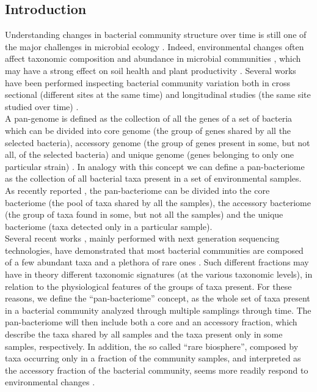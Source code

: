 \subsection{Introduction}
Understanding changes in bacterial community structure over time is still one of the major challenges in microbial ecology \cite{ge2008differences, zhou2014stochasticity, donn2014evolution}. Indeed, environmental changes often affect taxonomic composition and abundance in microbial communities \cite{allison2008resistance}, which may have a strong effect on soil health and plant productivity \cite{chaparro2012manipulating}. Several works have been performed inspecting bacterial community variation both in cross sectional (different sites at the same time) and longitudinal studies (the same site studied over time) \cite{costello2009bacterial, pini2012exploring, smith2012cervical, bartram2014exploring, logares2012biogeography, chen2013shifts, kuang2012contemporary}.\\
A pan-genome is defined as the collection of all the genes of a set of bacteria which can be divided into core genome (the group of genes shared by all the selected bacteria), accessory genome (the group of genes present in some, but not all, of the selected bacteria) and unique genome (genes belonging to only one particular strain) \cite{tettelin2008comparative}. In analogy with this concept we can define a pan-bacteriome as the collection of all bacterial taxa present in a set of environmental samples. As recently reported \cite{hardoim2014temporal}, the pan-bacteriome can be divided into the core bacteriome (the pool of taxa shared by all the samples), the accessory bacteriome (the group of taxa found in some, but not all the samples) and the unique bacteriome (taxa detected only in a particular sample).\\
Several recent works \cite{bartram2014exploring, logares2012biogeography, bowen2012salt, aravindraja2013ultradeep, dohrmann2012importance, gibbons2013evidence, kim2013general, oh2013altered, portillo2013cell, sanchez2013assessing, szekely2014importance, wegner2013disturbance}, mainly performed with next generation sequencing technologies, have demonstrated that most bacterial communities are composed of a few abundant taxa and a plethora of rare ones \cite{pedros2012rare}. Such different fractions may have in theory different taxonomic signatures (at the various taxonomic levels), in relation to the physiological features of the groups of taxa present. For these reasons, we define the ``pan-bacteriome'' concept, as the whole set of taxa present in a bacterial community analyzed through multiple samplings through time. The pan-bacteriome will then include both a core and an accessory fraction, which describe the taxa shared by all samples and the taxa present only in some samples, respectively. In addition, the so called ``rare biosphere'', composed by taxa occurring only in a fraction of the community samples, and interpreted as the accessory fraction of the bacterial community, seems more readily respond to environmental changes \cite{dohrmann2012importance, kim2013general, szekely2014importance, campbell2011activity, gobet2011diversity}.\\
